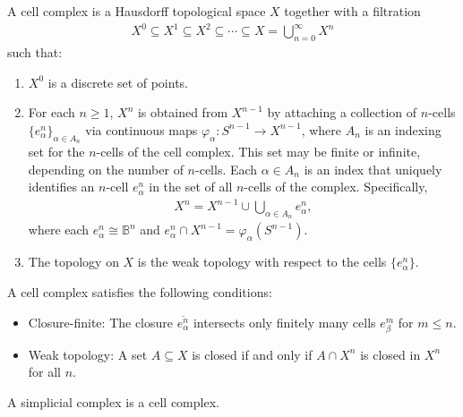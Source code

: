\begin{definition}
A cell complex is a Hausdorff topological space \(X\) together with a filtration
\begin{align}
X^0 \subseteq X^1 \subseteq X^2 \subseteq \cdots \subseteq X = \bigcup_{n=0}^{\infty} X^n
\end{align}
such that:
\begin{enumerate}
    \item \(X^0\) is a discrete set of points.
    \item For each \(n \geq 1\), \(X^n\) is obtained from \(X^{n-1}\) by attaching a collection of \(n\)-cells \(\{e^n_\alpha\}_{\alpha \in A_n}\) via continuous maps \(\varphi_\alpha : S^{n-1} \to X^{n-1}\), where \(A_n\) is an indexing set for the \(n\)-cells of the cell complex. This set may be finite or infinite, depending on the number of \(n\)-cells. Each \(\alpha \in A_n\) is an index that uniquely identifies an \(n\)-cell \(e^n_\alpha\) in the set of all \(n\)-cells of the complex. Specifically,
\begin{align}
    X^n = X^{n-1} \cup \bigcup_{\alpha \in A_n} e^n_\alpha,
\end{align}
    where each \(e^n_\alpha \cong \mathbb{B}^n\) and \(e^n_\alpha \cap X^{n-1} = \varphi_\alpha(S^{n-1})\).
    \item The topology on \(X\) is the weak topology with respect to the cells \(\{e^n_\alpha\}\).
\end{enumerate}
A cell complex satisfies the following conditions:
\begin{itemize}
    \item Closure-finite: The closure \(\overline{e^n_\alpha}\) intersects only finitely many cells \(e^m_\beta\) for \(m \leq n\).
    \item Weak topology: A set \(A \subseteq X\) is closed if and only if \(A \cap X^n\) is closed in \(X^n\) for all \(n\).
\end{itemize}
\end{definition}

\begin{proposition}
A simplicial complex is a cell complex.
\end{proposition}

